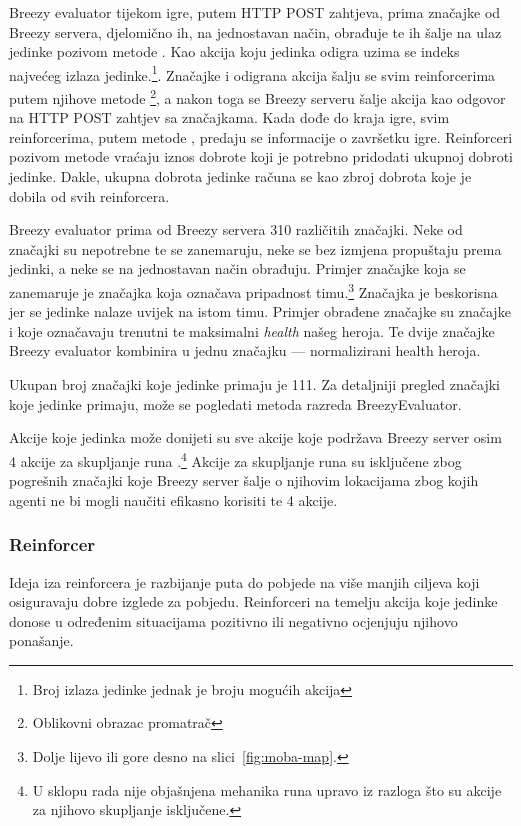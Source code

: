 \documentclass[times, utf8, zavrsni, numeric]{fer}
\begin{document}
Breezy evaluator tijekom igre, putem HTTP POST zahtjeva, prima značajke od
Breezy servera, djelomično ih, na jednostavan način, obrađuje te ih šalje na
ulaz jedinke pozivom metode . Kao akcija koju jedinka odigra
uzima se indeks najvećeg izlaza jedinke.\footnote{Broj izlaza jedinke jednak je
broju mogućih akcija}.  Značajke i odigrana akcija šalju se svim reinforcerima
putem njihove metode \footnote{Oblikovni obrazac promatrač}, a
nakon toga se Breezy serveru šalje akcija kao odgovor na HTTP POST zahtjev sa
značajkama. Kada dođe do kraja igre, svim reinforcerima, putem metode
, predaju se informacije o završetku igre. Reinforceri pozivom
metode  vraćaju iznos dobrote koji je potrebno pridodati ukupnoj
dobroti jedinke. Dakle, ukupna dobrota jedinke računa se kao zbroj dobrota koje
je dobila od svih reinforcera.

Breezy evaluator prima od Breezy servera 310 različitih značajki. Neke od
značajki su nepotrebne te se zanemaruju, neke se bez izmjena propuštaju prema
jedinki, a neke se na jednostavan način obrađuju. Primjer značajke koja se
zanemaruje je značajka  koja označava pripadnost
timu.\footnote{Dolje lijevo ili gore desno na slici~\ref{fig:moba-map}.}
Značajka je beskorisna jer se jedinke nalaze uvijek na istom timu. Primjer
obrađene značajke su značajke  i  koje
označavaju trenutni te maksimalni \emph{health} našeg heroja. Te dvije značajke
Breezy evaluator kombinira u jednu značajku --- normalizirani health heroja.

Ukupan broj značajki koje jedinke primaju je 111. Za detaljniji pregled značajki
koje jedinke primaju, može se pogledati metoda  razreda
BreezyEvaluator. 

Akcije koje jedinka može donijeti su sve akcije koje podržava Breezy server osim
4 akcije za skupljanje runa .\footnote{U sklopu rada nije objašnjena
mehanika runa upravo iz razloga što su akcije za njihovo skupljanje isključene.}
Akcije za skupljanje runa su isključene zbog pogrešnih značajki koje Breezy
server šalje o njihovim lokacijama zbog kojih agenti ne bi mogli naučiti
efikasno korisiti te 4 akcije.


\subsubsection{Reinforcer}

Ideja iza reinforcera je razbijanje puta do pobjede na više manjih ciljeva koji
osiguravaju dobre izglede za pobjedu. Reinforceri na temelju akcija koje jedinke
donose u određenim situacijama pozitivno ili negativno ocjenjuju njihovo
ponašanje.
\end{document}
